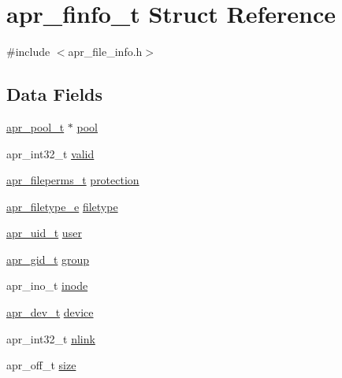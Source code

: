\hypertarget{structapr__finfo__t}{}\section{apr\+\_\+finfo\+\_\+t Struct Reference}
\label{structapr__finfo__t}


{\ttfamily \#include $<$apr\+\_\+file\+\_\+info.\+h$>$}

\subsection*{Data Fields}
\begin{DoxyCompactItemize}
\item 
\hyperlink{group__apr__pools_gaf137f28edcf9a086cd6bc36c20d7cdfb}{apr\+\_\+pool\+\_\+t} $\ast$ \hyperlink{structapr__finfo__t_a71496f86b5489c87e58e9c03fe468fb8}{pool}
\item 
apr\+\_\+int32\+\_\+t \hyperlink{structapr__finfo__t_aff0cdf06637edec63c4701e582792019}{valid}
\item 
\hyperlink{group__apr__file__info_ga3af19c4c47007169064a70f9351bc7d8}{apr\+\_\+fileperms\+\_\+t} \hyperlink{structapr__finfo__t_a7c09d73ad1957e2c0e6c6b77d94e90ab}{protection}
\item 
\hyperlink{group__apr__file__info_gae3f0ce3014337a52b39852f8bf81ca7c}{apr\+\_\+filetype\+\_\+e} \hyperlink{structapr__finfo__t_a274ae0dd60b59182c2e0134bc9a09a20}{filetype}
\item 
\hyperlink{group__apr__user_gad1aa508f584bc230acf4f68ba4fc4de7}{apr\+\_\+uid\+\_\+t} \hyperlink{structapr__finfo__t_ab79d14bd50f50662d29ad433166c4bc5}{user}
\item 
\hyperlink{group__apr__user_ga22e9e224e984f837f3e276833e2f3a55}{apr\+\_\+gid\+\_\+t} \hyperlink{structapr__finfo__t_a15c9c056330308de4dafb3826a9b02bc}{group}
\item 
apr\+\_\+ino\+\_\+t \hyperlink{structapr__finfo__t_a73aebb666ddc391d53a871802c27eed6}{inode}
\item 
\hyperlink{group__apr__file__info_gae2c25c4b679613081599f776efa96c4a}{apr\+\_\+dev\+\_\+t} \hyperlink{structapr__finfo__t_a38cbfbff641284065481f5907d59c8bf}{device}
\item 
apr\+\_\+int32\+\_\+t \hyperlink{structapr__finfo__t_a98598f28735d75aa0c1994efc825e6d9}{nlink}
\item 
apr\+\_\+off\+\_\+t \hyperlink{structapr__finfo__t_a3e47a673c5b82a25a783a732dee6f946}{size}
\item 

\end{DoxyCompactItemize}
